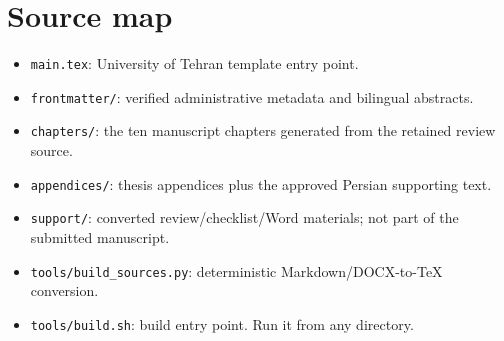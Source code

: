\section*{Source map}
\begin{itemize}
  \item \texttt{main.tex}: University of Tehran template entry point.
  \item \texttt{frontmatter/}: verified administrative metadata and bilingual abstracts.
  \item \texttt{chapters/}: the ten manuscript chapters generated from the retained review source.
  \item \texttt{appendices/}: thesis appendices plus the approved Persian supporting text.
  \item \texttt{support/}: converted review/checklist/Word materials; not part of the submitted manuscript.
  \item \texttt{tools/build\_sources.py}: deterministic Markdown/DOCX-to-TeX conversion.
  \item \texttt{tools/build.sh}: build entry point. Run it from any directory.
\end{itemize}
